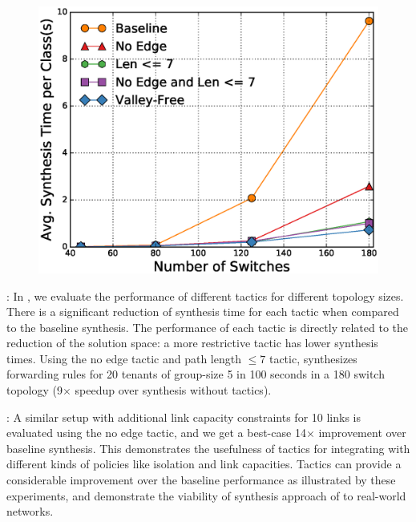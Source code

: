  \begin{figure}[h]
 		\centering
 	\includegraphics[width=0.75\columnwidth]{figures/isolationTopology.eps}
 	\label{fig:tactic-topo}
 \end{figure}
 
: 
In ,
 we evaluate the performance of different tactics for different topology sizes. There is a
 significant reduction of synthesis time for each tactic when compared to the baseline synthesis.
 The performance of each tactic is directly related to the reduction of the solution space: a more
 restrictive tactic has lower synthesis times. 
  Using the no edge tactic
 and path length $\leq 7$ tactic, \Name synthesizes forwarding rules for 20 tenants of group-size 5 in 100 seconds in a 180 switch
 topology (9$\times$ speedup over synthesis without tactics).
  
 : A similar setup
 with additional link capacity constraints for 10 links is evaluated
 using the no edge tactic, and we get a best-case 14$\times$
 improvement over baseline synthesis. This demonstrates the usefulness
 of tactics for integrating with different kinds of policies like isolation
 and link capacities.  Tactics can provide a considerable improvement
 over the baseline performance as illustrated by these experiments,
 and demonstrate the viability of synthesis approach of \Name to
 real-world networks.
 
